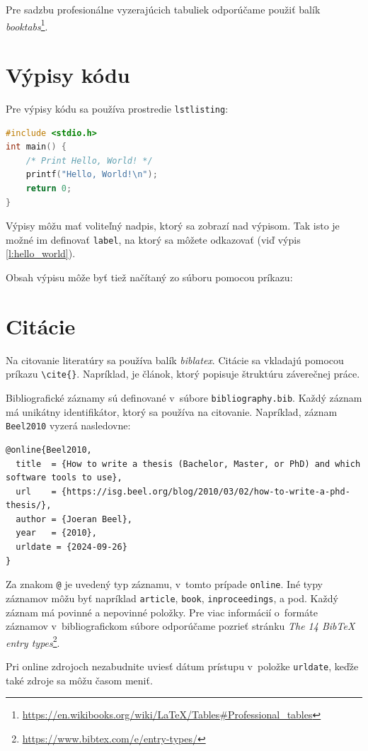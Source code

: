Pre sadzbu profesionálne vyzerajúcich tabuliek odporúčame použiť balík \emph{booktabs}\footnote{\url{https://en.wikibooks.org/wiki/LaTeX/Tables\#Professional_tables}}.


\section{Výpisy kódu}

Pre výpisy kódu sa používa prostredie \texttt{lstlisting}:

\begin{lstlisting}[language=C,caption={Program, ktorý pozdraví celý svet}, label={l:hello_world}]
#include <stdio.h>
int main() {
    /* Print Hello, World! */
    printf("Hello, World!\n");
    return 0;
}
\end{lstlisting}

Výpisy môžu mať voliteľný nadpis, ktorý sa zobrazí nad výpisom. Tak isto je možné im definovať \texttt{label}, na ktorý sa môžete odkazovať (viď výpis \ref{l:hello_world}).

Obsah výpisu môže byť tiež načítaný zo súboru pomocou príkazu:




\section{Citácie}

Na citovanie literatúry sa používa balík \emph{biblatex}. Citácie sa vkladajú pomocou príkazu \verb|\cite{}|. Napríklad, \cite{Beel2010} je článok, ktorý popisuje štruktúru záverečnej práce.

Bibliografické záznamy sú definované v~súbore \texttt{bibliography.bib}. Každý záznam má unikátny identifikátor, ktorý sa používa na citovanie. Napríklad, záznam \texttt{Beel2010} vyzerá nasledovne:


\begin{lstlisting}[breaklines=true, prebreak=\mbox{\textcolor{red}{$\hookleftarrow$}}]
@online{Beel2010,
  title  = {How to write a thesis (Bachelor, Master, or PhD) and which software tools to use},
  url    = {https://isg.beel.org/blog/2010/03/02/how-to-write-a-phd-thesis/},
  author = {Joeran Beel},
  year   = {2010},
  urldate = {2024-09-26}
}
\end{lstlisting}

Za znakom \texttt{@} je uvedený typ záznamu, v~tomto prípade \texttt{online}. Iné typy záznamov môžu byť napríklad \texttt{article}, \texttt{book}, \texttt{inproceedings}, a pod. Každý záznam má povinné a nepovinné položky. Pre viac informácií o~formáte záznamov v~bibliografickom súbore odporúčame pozrieť stránku \emph{The 14 BibTeX entry types}\footnote{\url{https://www.bibtex.com/e/entry-types/}}.

Pri online zdrojoch nezabudnite uviesť dátum prístupu v~položke \texttt{urldate}, keďže také zdroje sa môžu časom meniť.
